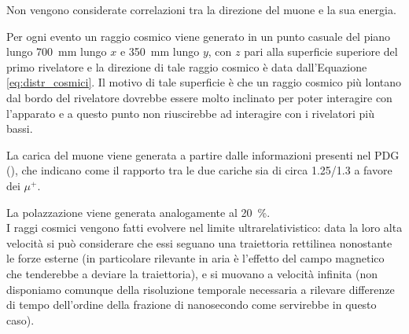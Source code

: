 Non vengono considerate correlazioni tra la direzione del muone e la sua energia.

Per ogni evento un raggio cosmico viene generato in un punto casuale del piano lungo \SI{700}{\mm} lungo $x$ e \SI{350}{\mm} lungo $y$, con $z$ pari alla superficie superiore del primo rivelatore e la direzione di tale raggio cosmico è data dall'Equazione \ref{eq:distr_cosmici}. Il motivo di tale superficie \`e che un raggio cosmico pi\`u lontano dal bordo del rivelatore dovrebbe essere molto inclinato per poter interagire con l'apparato e a questo punto non riuscirebbe ad interagire con i rivelatori pi\`u bassi.

La carica del muone viene generata a partire dalle informazioni presenti nel PDG (\cite{bib:Patrignani:2016xqp}), che indicano come il rapporto tra le due cariche sia di circa 1.25/1.3 a favore dei $\mu^+$.

La polazzazione viene generata analogamente al \SI{20}{\percent}.\\

I raggi cosmici vengono fatti evolvere nel limite ultrarelativistico: data la loro alta velocità si può considerare che essi seguano una traiettoria rettilinea nonostante
le forze esterne (in particolare rilevante in aria è l'effetto del campo magnetico che tenderebbe a deviare la traiettoria), e si muovano a velocità infinita (non disponiamo comunque della risoluzione temporale necessaria a rilevare differenze di tempo dell'ordine della frazione di nanosecondo come servirebbe in questo caso).
